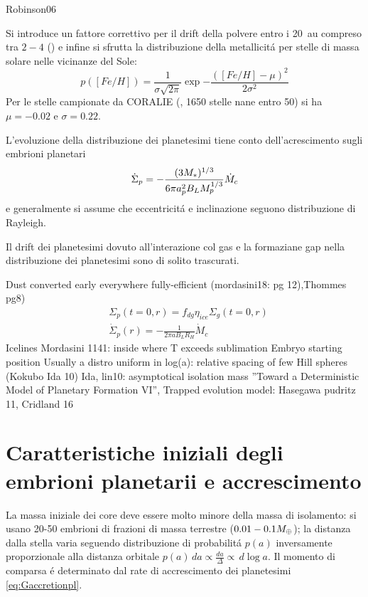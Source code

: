\begin{workout}
Robinson06
\end{workout}

Si introduce un fattore correttivo per il drift della polvere entro i \SI{20}{\astronomicalunit} compreso tra $2-4$ (\cite{kornet2004alternative}) e infine si sfrutta la distribuzione della metallicit\'a per stelle di massa solare nelle vicinanze del Sole:
\begin{equation}
p([Fe/H])=\frac{1}{\sigma\sqrt{2\pi}}\exp{-\frac{([Fe/H]-\mu)^2}{2\sigma^2}}
\end{equation}
Per le stelle campionate da CORALIE (\cite{udry2000coralie}, 1650 stelle nane entro \SI{50}{\parsec}) si ha $\mu=-0.02$ e $\sigma=0.22$.

L'evoluzione della distribuzione dei planetesimi tiene conto dell'acrescimento sugli embrioni planetari
\begin{equation}\dot{\Sigma}_p=-\frac{(3M_*)^{1/3}}{6\pi a_p^2B_LM_p^{1/3}}\dot{M}_c\end{equation}
e generalmente si assume che eccentricit\'a e inclinazione seguono distribuzione di Rayleigh.

Il drift dei planetesimi dovuto all'interazione col gas e la formaziane gap nella distribuzione dei planetesimi sono di solito trascurati.

\begin{workout}
Dust converted early everywhere fully-efficient (mordasini18: pg 12),Thommes pg8)
\begin{align*}
&\Sigma_p(t=0,r)=f_{dg}\eta_{ice}\Sigma_g(t=0,r)\\
&\dot{\Sigma}_p(r)=-\frac{1}{2\pi aB_LR_H}\dot{M}_c
\end{align*}
Icelines Mordasini 1141: inside where T exceeds sublimation
{Embryo starting position}
Usually a distro uniform in log(a): relative spacing of few Hill spheres (Kokubo Ida 10)
Ida, lin10: asymptotical isolation mass ''Toward a Deterministic Model of Planetary Formation VI'',
Trapped evolution model: Hasegawa pudritz 11, Cridland 16
\end{workout}

\section{Caratteristiche iniziali degli embrioni planetarii e accrescimento}

La massa iniziale dei core deve essere molto minore della massa di isolamento: si usano 20-50 embrioni di frazioni di massa terrestre ($0.01-0.1M_{\oplus}{}$); la distanza dalla stella varia seguendo distribuzione di probabilit\'a $p(a)$ inversamente proporzionale alla distanza orbitale $p(a)\,da\propto\frac{da}{\Delta}\propto\,d\log{a}$. Il momento di comparsa \'e determinato dal rate di accrescimento dei planetesimi \eqref{eq:Gaccretionpl}.

